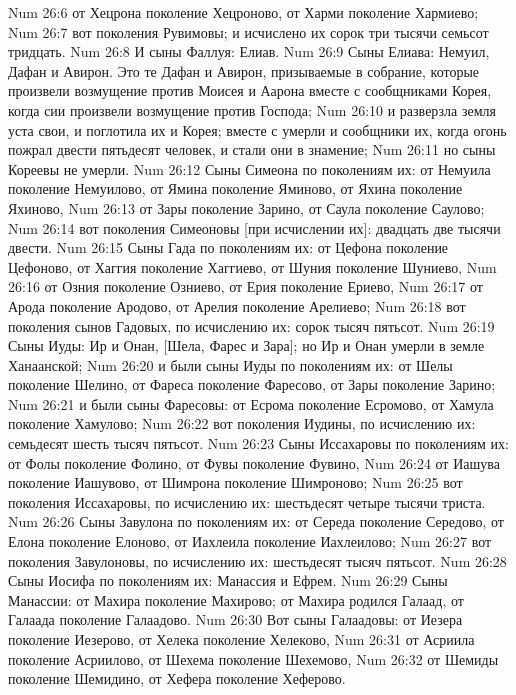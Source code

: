 \vs Num 26:6 от Хецрона поколение Хецроново, от Харми поколение Хармиево;
\vs Num 26:7 вот поколения Рувимовы; и исчислено их сорок три тысячи семьсот тридцать.
\vs Num 26:8 И сыны Фаллуя: Елиав.
\vs Num 26:9 Сыны Елиава: Немуил, Дафан и Авирон. Это те Дафан и Авирон, призываемые в собрание, которые произвели возмущение против Моисея и Аарона вместе с сообщниками Корея, когда сии произвели возмущение против Господа;
\vs Num 26:10 и разверзла земля уста свои, и поглотила их и Корея; вместе с  умерли и сообщники их, когда огонь пожрал двести пятьдесят человек, и стали они в знамение;
\vs Num 26:11 но сыны Кореевы не умерли.
\vs Num 26:12 Сыны Симеона по поколениям их: от Немуила поколение Немуилово, от Ямина поколение Яминово, от Яхина поколение Яхиново,
\vs Num 26:13 от Зары поколение Зарино, от Саула поколение Саулово;
\vs Num 26:14 вот поколения Симеоновы [при исчислении их]: двадцать две тысячи двести.
\vs Num 26:15 Сыны Гада по поколениям их: от Цефона поколение Цефоново, от Хаггия поколение Хаггиево, от Шуния поколение Шуниево,
\vs Num 26:16 от Озния поколение Озниево, от Ерия поколение Ериево,
\vs Num 26:17 от Арода поколение Ародово, от Арелия поколение Арелиево;
\vs Num 26:18 вот поколения сынов Гадовых, по исчислению их: сорок тысяч пятьсот.
\vs Num 26:19 Сыны Иуды: Ир и Онан, [Шела, Фарес и Зара]; но Ир и Онан умерли в земле Ханаанской;
\vs Num 26:20 и были сыны Иуды по поколениям их: от Шелы поколение Шелино, от Фареса поколение Фаресово, от Зары поколение Зарино;
\vs Num 26:21 и были сыны Фаресовы: от Есрома поколение Есромово, от Хамула поколение Хамулово;
\vs Num 26:22 вот поколения Иудины, по исчислению их: семьдесят шесть тысяч пятьсот.
\vs Num 26:23 Сыны Иссахаровы по поколениям их: от Фолы поколение Фолино, от Фувы поколение Фувино,
\vs Num 26:24 от Иашува поколение Иашувово, от Шимрона поколение Шимроново;
\vs Num 26:25 вот поколения Иссахаровы, по исчислению их: шестьдесят четыре тысячи триста.
\vs Num 26:26 Сыны Завулона по поколениям их: от Середа поколение Середово, от Елона поколение Елоново, от Иахлеила поколение Иахлеилово;
\vs Num 26:27 вот поколения Завулоновы, по исчислению их: шестьдесят тысяч пятьсот.
\vs Num 26:28 Сыны Иосифа по поколениям их: Манассия и Ефрем.
\vs Num 26:29 Сыны Манассии: от Махира поколение Махирово; от Махира родился Галаад, от Галаада поколение Галаадово.
\vs Num 26:30 Вот сыны Галаадовы: от Иезера поколение Иезерово, от Хелека поколение Хелеково,
\vs Num 26:31 от Асриила поколение Асриилово, от Шехема поколение Шехемово,
\vs Num 26:32 от Шемиды поколение Шемидино, от Хефера поколение Хеферово.

